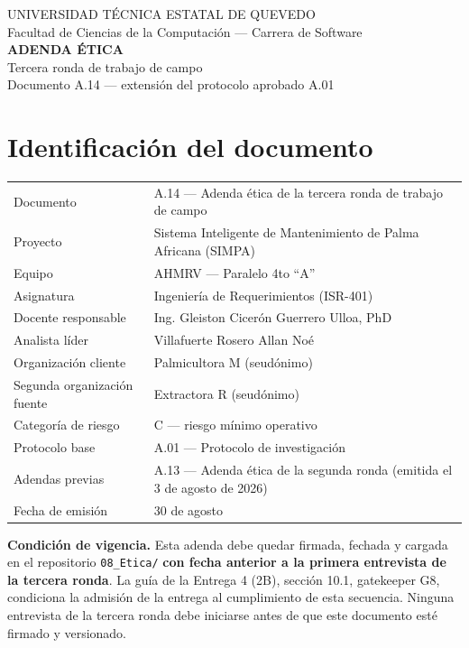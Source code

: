 \documentclass[11pt,a4paper]{article}
\begin{document}
\begin{center}
{\footnotesize UNIVERSIDAD TÉCNICA ESTATAL DE QUEVEDO\\
Facultad de Ciencias de la Computación --- Carrera de Software}\\[10pt]
{\Large\bfseries\color{uteqverde} ADENDA ÉTICA}\\[3pt]
{\large Tercera ronda de trabajo de campo}\\[2pt]
{\footnotesize Documento A.14 --- extensión del protocolo aprobado A.01}
\end{center}

\vspace{6pt}

\section*{Identificación del documento}
\renewcommand{\arraystretch}{1.25}
\begin{longtable}{|L{5.0cm}|L{10.6cm}|}
\hline
{}\\
\hline
Documento & A.14 --- Adenda ética de la tercera ronda de trabajo de campo \\
\hline
Proyecto & Sistema Inteligente de Mantenimiento de Palma Africana (SIMPA) \\
\hline
Equipo & AHMRV --- Paralelo 4to ``A'' \\
\hline
Asignatura & Ingeniería de Requerimientos (ISR-401) \\
\hline
Docente responsable & Ing. Gleiston Cicerón Guerrero Ulloa, PhD \\
\hline
Analista líder & Villafuerte Rosero Allan Noé \\
\hline
Organización cliente & Palmicultora M (seudónimo) \\
\hline
Segunda organización fuente & Extractora R (seudónimo) \\
\hline
Categoría de riesgo & C --- riesgo mínimo operativo \\
\hline
Protocolo base & A.01 --- Protocolo de investigación \\
\hline
Adendas previas & A.13 --- Adenda ética de la segunda ronda (emitida el 3 de agosto de 2026) \\
\hline
Fecha de emisión & 30 de agosto \\
\hline
\end{longtable}

\begin{tcolorbox}[colback=red!4,colframe=red!55!black,boxrule=0.8pt,arc=2pt,left=6pt,right=6pt,top=5pt,bottom=5pt]
\textbf{Condición de vigencia.} Esta adenda debe quedar firmada, fechada y cargada en el repositorio
\texttt{08\_Etica/} \textbf{con fecha anterior a la primera entrevista de la tercera ronda}. La guía de la
Entrega 4 (2B), sección 10.1, gatekeeper G8, condiciona la admisión de la entrega al cumplimiento de esta
secuencia. Ninguna entrevista de la tercera ronda debe iniciarse antes de que este documento esté firmado y
versionado.
\end{tcolorbox}
\end{document}
